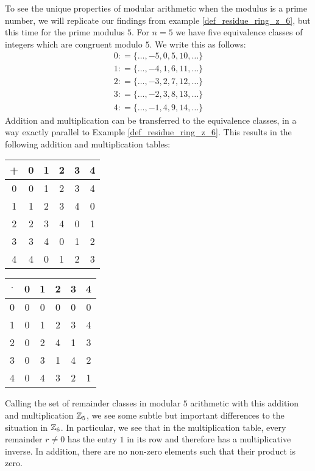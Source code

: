 \begin{example} 
\label{primfield_z_5}
To see the unique properties of modular arithmetic when the modulus is a prime number, we will replicate our findings from example \ref{def_residue_ring_z_6}, but this time for the prime modulus $5$.
For $ n = 5 $ we have five equivalence classes of integers which are congruent modulo $ 5 $. We write this as follows:
$$
\begin{array}{ccc}
0: = \{\ldots, -5,0,5,10, \ldots \}\\
1: = \{\ldots, -4,1,6,11, \ldots \}\\
2: = \{\ldots, -3,2,7,12, \ldots \} \\
3: = \{\ldots, -2,3,8,13, \ldots \}\\
4: = \{\ldots, -1,4,9,14, \ldots \}
\end{array}
$$
Addition and multiplication can be transferred to the equivalence classes, in a way exactly parallel to Example \ref{def_residue_ring_z_6}. This results in the following addition and multiplication tables:
\begin{center}
  \begin{tabular}{c | c c c c c}
    + & 0 & 1 & 2 & 3 & 4 \\\hline
    0 & 0 & 1 & 2 & 3 & 4 \\
    1 & 1 & 2 & 3 & 4 & 0 \\
    2 & 2 & 3 & 4 & 0 & 1 \\
    3 & 3 & 4 & 0 & 1 & 2 \\
    4 & 4 & 0 & 1 & 2 & 3 \\
  \end{tabular} \quad \quad \quad \quad
  \begin{tabular}{c | c c c c c}
$ \cdot $ & 0 & 1 & 2 & 3 & 4 \\\hline
      0 & 0 & 0 & 0 & 0 & 0 \\
      1 & 0 & 1 & 2 & 3 & 4 \\
      2 & 0 & 2 & 4 & 1 & 3 \\
      3 & 0 & 3 & 1 & 4 & 2 \\
      4 & 0 & 4 & 3 & 2 & 1 \\
  \end{tabular}
\end{center}
Calling the set of remainder classes in modular $5$ arithmetic with this addition and multiplication $\mathbb{Z}_5$, we see some subtle but important differences to the situation in $\mathbb{Z}_6$. In particular, we see that in the multiplication table, every remainder $r\neq 0$ has the entry $1$ in its row and therefore has a multiplicative inverse. In addition, there are no non-zero elements such that their product is zero.


\end{example}
